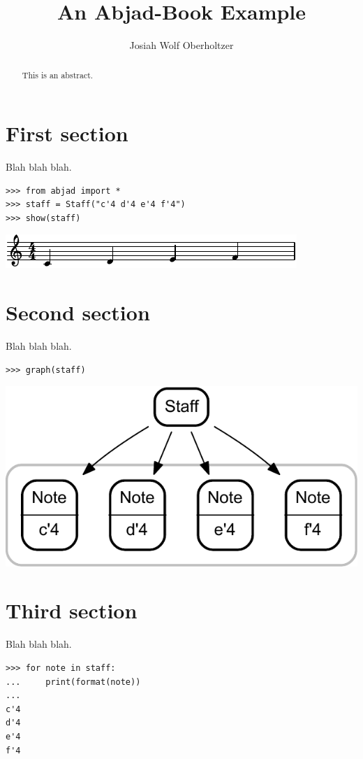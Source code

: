 \documentclass[10pt]{article}
\title{An Abjad-Book Example}
\author{Josiah Wolf Oberholtzer}
\begin{document}
\maketitle

\begin{abstract}
This is an abstract.
\end{abstract}

\section{First section}

Blah blah blah.

\begin{lstlisting}
>>> from abjad import *
>>> staff = Staff("c'4 d'4 e'4 f'4")
>>> show(staff)
\end{lstlisting}
\noindent\includegraphics{assets/lilypond-3947a1689e36c26dfc1db5d199985257.pdf}

\section{Second section}

Blah blah blah.

\begin{lstlisting}
>>> graph(staff)
\end{lstlisting}
\noindent\includegraphics[scale=0.4,]{assets/graphviz-d87bd508a47c27950599579a60153181.pdf}

\section{Third section}

Blah blah blah.

\begin{lstlisting}
>>> for note in staff:
...     print(format(note))
...
c'4
d'4
e'4
f'4
\end{lstlisting}
\end{document}
